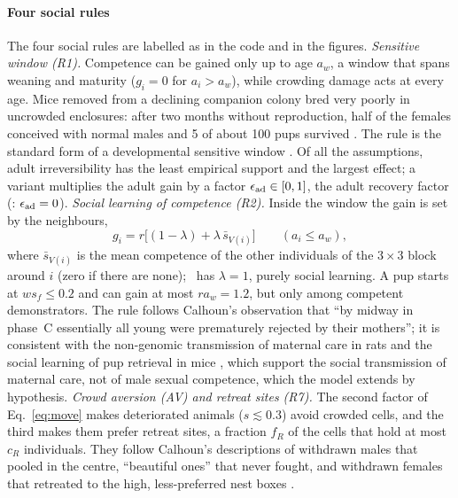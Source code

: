 \paragraph{Four social rules}
The four social rules are labelled as in the code and in the figures.
\emph{Sensitive window (R1).} Competence can be gained only up to age $a_w$, a window that spans weaning and
maturity ($g_i=0$ for $a_i>a_w$), while crowding damage acts at every age. Mice removed from a declining companion
colony bred very poorly in uncrowded enclosures: after two months without reproduction, half of the females
conceived with normal males and 5 of about 100 pups survived \citep{Marsden1972}. The rule is the standard form of a
developmental sensitive window \citep{FawcettFrankenhuis2015}. Of all the assumptions, adult irreversibility has the
least empirical support and the largest effect; a variant multiplies the adult gain by a factor $\epsilon_{\rm ad}\in[0,1]$,
the adult recovery factor (\Cone: $\epsilon_{\rm ad}=0$).
\emph{Social learning of competence (R2).} Inside the window the gain is set by the neighbours,
\begin{equation}\label{eq:learning}
  g_i=r\bigl[(1-\lambda)+\lambda\,\bar s_{V(i)}\bigr]\qquad(a_i\le a_w),
\end{equation}
where $\bar s_{V(i)}$ is the mean competence of the other individuals of the $3\times3$ block around $i$ (zero if
there are none); \Cone\ has $\lambda=1$, purely social learning. A pup starts at $ws_f\le0.2$ and can gain at most
$ra_w=1.2$, but only among competent demonstrators. The rule follows Calhoun's observation that ``by midway in
phase~C essentially all young were prematurely rejected by their mothers''; it is consistent with the non-genomic
transmission of maternal care in rats \citep{Francis1999} and the social learning of pup retrieval in mice
\citep{Carcea2021}, which support the social transmission of maternal care, not of male sexual competence, which
the model extends by hypothesis.
\emph{Crowd aversion (AV) and retreat sites (R7).} The second factor of Eq.~\eqref{eq:move} makes deteriorated
animals ($s\lesssim0.3$) avoid crowded cells, and the third makes them prefer retreat sites, a fraction $f_R$ of the
cells that hold at most $c_R$ individuals. They follow Calhoun's descriptions of withdrawn males that pooled in the
centre, ``beautiful ones'' that never fought, and withdrawn females that retreated to the high, less-preferred nest
boxes \citep{Calhoun1973}.

